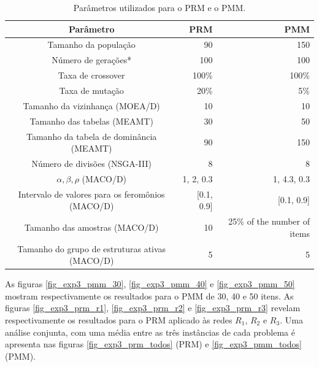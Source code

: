 \begin{table}[!htbp]
	\caption{Parâmetros utilizados para o PRM e o PMM.}
	\label{table_exp3_parametros}
	\begin{center}
		\begin{tabular}{c|r|r}
			\textbf{Parâmetro} & \textbf{PRM} &  \textbf{PMM} \\ %
			\hline
			Tamanho da população               &    90 &      150 \\ %
			Número de gerações*        &   100 &      100 \\ %
			Taxa de crossover                & 100\% &    100\% \\ %
			Taxa de mutação                 &  20\% &      5\% \\ %
			Tamanho da vizinhança (MOEA/D)    &    10 &       10 \\ %
			Tamanho das tabelas (MEAMT)   &    30 &       50 \\ %
			Tamanho da tabela de dominância (MEAMT) &    90 &      150 \\ %
			Número de divisões (NSGA-III)&     8 &        8 \\ %
			$\alpha, \beta, \rho$ (MACO/D)& 1, 2, 0.3 & 1, 4.3, 0.3 \\ %
			Intervalo de valores para os feromônios (MACO/D)& [0.1, 0.9] & [0.1, 0.9] \\ %
			Tamanho das amostras (MACO/D)& 10 &25\% of the number of items \\  %
			Tamanho do grupo de estruturas ativas (MACO/D)& 5 & 5 \\
			\hline
		\end{tabular}
	\end{center}
\end{table}

As figuras \ref{fig_exp3_pmm_30}, \ref{fig_exp3_pmm_40} e \ref{fig_exp3_pmm_50} mostram respectivamente os resultados para o PMM de 30, 40 e 50 itens. As figuras \ref{fig_exp3_prm_r1}, \ref{fig_exp3_prm_r2} e \ref{fig_exp3_prm_r3} revelam respectivamente os resultados para o PRM aplicado às redes $R_1$, $R_2$ e $R_3$. Uma análise conjunta, com uma média entre as três instâncias de cada problema é apresenta nas figuras \ref{fig_exp3_prm_todos} (PRM) e \ref{fig_exp3_pmm_todos} (PMM).

